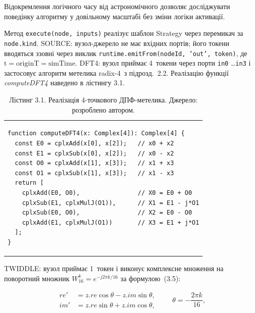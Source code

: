 \documentclass[
]{article}
\begin{document}
Відокремлення логічного часу від
астрономічного дозволяє досліджувати поведінку алгоритму у довільному
масштабі без зміни логіки активації.

Метод
\texttt{execute}\texttt{(}\texttt{node}\texttt{,\ }\texttt{inputs}\texttt{)}
реалізує шаблон Strategy через перемикач за \texttt{node.kind}. SOURCE:
вузол-джерело не має вхідних портів; його токени вводяться ззовні через
виклик
\texttt{runtime.emitFrom}\texttt{(}\texttt{nodeId}\texttt{,\ ’}\texttt{out}\texttt{’,\ }\texttt{token}\texttt{)},
де \(\text{t} = \text{originT} = \text{simTime}\). DFT4: вузол приймає
4~токени через порти \texttt{in0} \ldots{}\texttt{in3} і застосовує
алгоритм метелика radix-4~з підрозд.~2.2. Реалізацію функції
\emph{computeDFT4} наведено в лістингу 3.1.

\begin{longtable}[]{@{}
  >{\raggedright\arraybackslash}p{}@{}}
\caption{Лістинг 3.1. Реалізація 4-точкового ДПФ-метелика. Джерело:
розроблено автором.}\tabularnewline
\toprule\noalign{}
\endfirsthead
\endhead
\bottomrule\noalign{}
\endlastfoot
\begin{minipage}[t]{\linewidth}\raggedright
\begin{verbatim}
function computeDFT4(x: Complex[4]): Complex[4] {
  const E0 = cplxAdd(x[0], x[2]);   // x0 + x2
  const E1 = cplxSub(x[0], x[2]);   // x0 - x2
  const O0 = cplxAdd(x[1], x[3]);   // x1 + x3
  const O1 = cplxSub(x[1], x[3]);   // x1 - x3
  return [
    cplxAdd(E0, O0),                // X0 = E0 + O0
    cplxSub(E1, cplxMulJ(O1)),      // X1 = E1 - j*O1
    cplxSub(E0, O0),                // X2 = E0 - O0
    cplxAdd(E1, cplxMulJ(O1))       // X3 = E1 + j*O1
  ];
}
\end{verbatim}
\end{minipage} \\
\end{longtable}

TWIDDLE: вузол приймає 1~токен і виконує комплексне множення на
поворотний множник \(W_{16}^{k} = e^{- j2\pi k/16}\) за формулою~(3.5):

\begin{equation}
\tag{3.5}\label{eq:twiddle-mul}
\begin{aligned}
{re}' & = z.re\cos\theta - z.im\sin\theta, \\
{im}' & = z.re\sin\theta + z.im\cos\theta,
\end{aligned}\qquad \theta = - \frac{2\pi k}{16},
\end{equation}
\end{document}
